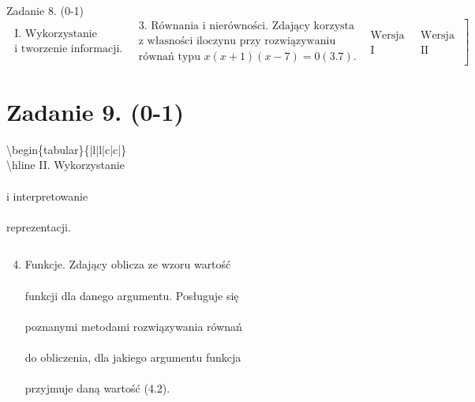 \documentclass[10pt]{article}
\begin{document}
Zadanie 8. (0-1)\\
$\left.\begin{array}{|l|l|c|c|}\hline \text { I. Wykorzystanie } \\ \text { i tworzenie informacji. }\end{array} \begin{array}{l}\text { 3. Równania i nierówności. Zdający korzysta } \\ \text { z własności iloczynu przy rozwiązywaniu } \\ \text { równań typu } x(x+1)(x-7)=0(3.7) .\end{array} \begin{array}{c}\text { Wersja } \\ \text { I }\end{array} \begin{array}{c}\text { Wersja } \\ \text { II }\end{array}\right]$

\section*{Zadanie 9. (0-1)}
$\left.$\textbackslash begin\{tabular\}\{|l|l|c|c|\}\\
\textbackslash hline II. Wykorzystanie \\
\\
i interpretowanie \\
\\
reprezentacji.

 \begin{tabular}{l}
\end{tabular}

\begin{enumerate}
  \setcounter{enumi}{3}
  \item Funkcje. Zdający oblicza ze wzoru wartość \\
\\
funkcji dla danego argumentu. Posługuje się \\
\\
poznanymi metodami rozwiązywania równań \\
\\
do obliczenia, dla jakiego argumentu funkcja \\
\\
przyjmuje daną wartość (4.2).
\end{enumerate}

 \begin{tabular}{c}
\end{tabular}
\end{document}
